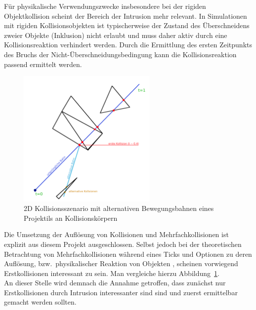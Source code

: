 Für physikalische Verwendungszwecke insbesondere bei der rigiden Objektkollision scheint der Bereich der Intrusion mehr relevant. In Simulationen mit rigiden Kollisionsobjekten ist typischerweise der Zustand des Überschneidens zweier Objekte (Inklusion) nicht erlaubt und muss daher aktiv durch eine Kollisionsreaktion verhindert werden. Durch die Ermittlung des ersten Zeitpunkts des Bruchs der Nicht-Überschneidungsbedingung kann die Kollisionsreaktion passend ermittelt werden.\\
\begin{figure}
	\centering
	\includegraphics[width=0.6\textwidth]{./res/l3_col.png}
	\caption{2D Kollisionsszenario mit alternativen Bewegungsbahnen eines Projektils an Kollisionskörpern}
	\label{fig:l3col}
\end{figure}
Die Umsetzung der Auflösung von Kollisionen und Mehrfachkollisionen ist explizit aus diesem Projekt ausgeschlossen. Selbst jedoch bei der theoretischen Betrachtung von Mehrfachkollisionen während eines Ticks und Optionen zu deren Auflösung, bzw.~physikalischer Reaktion von Objekten , scheinen vorwiegend Erstkollisionen interessant zu sein. Man vergleiche hierzu Abbildung~\ref{fig:l3col}.\\
An dieser Stelle wird demnach die Annahme getroffen, dass zunächst nur Erstkollisionen durch Intrusion interessanter sind sind und zuerst ermittelbar gemacht werden sollten.




